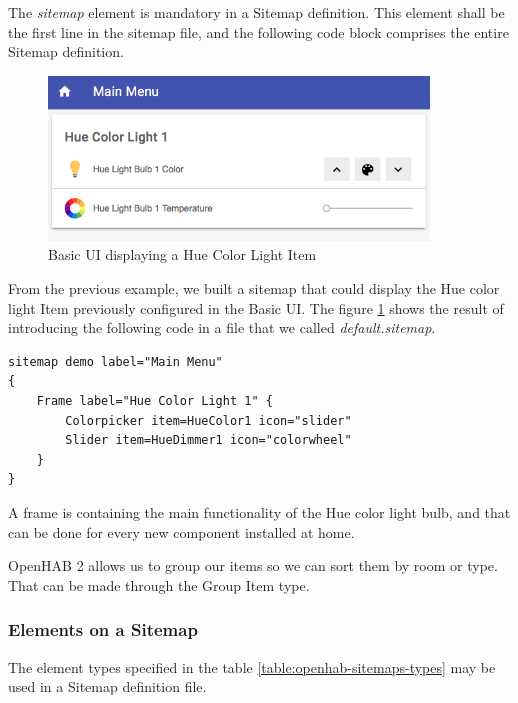 The \textit{sitemap} element is mandatory in a Sitemap definition. This element shall be the first line in the sitemap file, and the
following code block comprises the entire Sitemap definition.\cite{openHABDocs}

\begin{figure}
    \centering
    \includegraphics[width=0.9\textwidth]{images/Chapter_06/hue-bulb-sitemap.png}
    \caption{Basic UI displaying a Hue Color Light Item}
    \label{fig:hue-bulb-sitemap}
\end{figure}

From the previous example, we built a sitemap that could display the Hue color light Item previously configured in the Basic UI.
The figure \ref{fig:hue-bulb-sitemap} shows the result of introducing the following code in a file that we called \textit{default.sitemap}.

\begin{lstlisting}[style=Consola]
sitemap demo label="Main Menu"
{
    Frame label="Hue Color Light 1" {
        Colorpicker item=HueColor1 icon="slider"
        Slider item=HueDimmer1 icon="colorwheel"
    }
}
\end{lstlisting}

A frame is containing the main functionality of the Hue color light bulb, and that can be done for every new component installed at home.

OpenHAB 2 allows us to group our items so we can sort them by room or type. That can be made through the Group Item type.

\subsubsection{Elements on a Sitemap}
The element types specified in the table \ref{table:openhab-sitemaps-types} may be used in a Sitemap definition file.

